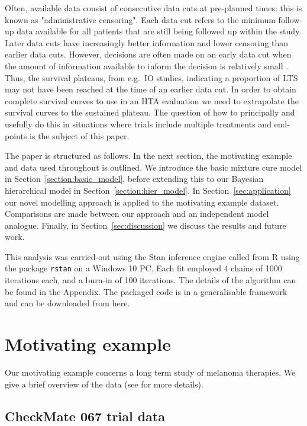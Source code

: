 \documentclass[AMA,STIX1COL]{WileyNJD-v2}
\begin{document}
Often, available data consist of consecutive data cuts at pre-planned times: this is known as "administrative censoring".
Each data cut refers to the minimum follow-up data available for all patients that are still being followed up within the study.
Later data cuts have increasingly better information and lower censoring than earlier data cuts.
However, decisions are often made on an early data cut when the amount of information available to inform the decision is relatively small \citep{Bullement2020}.
Thus, the survival plateaus, from e.g.~IO studies, indicating a proportion of LTS may not have been reached at the time of an earlier data cut.
In order to obtain complete survival curves to use in an HTA evaluation we need to extrapolate the survival curves to the sustained plateau. 
The question of how to principally and usefully do this in situations where trials include multiple treatments and end-points is the subject of this paper.

The paper is structured as follows.
In the next section, the motivating example and data used throughout is outlined.
We introduce the basic mixture cure model in Section~\ref{section:basic_model}, before extending this to our Bayesian hierarchical model in Section~\ref{section:hier_model}.
In Section~\ref{sec:application} our novel modelling approach is applied to the motivating example dataset.
Comparisons are made between our approach and an independent model analogue.
Finally, in Section~\ref{sec:discussion} we discuss the results and future work.

This analysis was carried-out using the Stan inference engine \cite{carpenter2017stan} called from R \cite{Rcoreteam} using the package \texttt{rstan} on a Windows 10 PC.
Each fit employed 4 chains of 1000 iterations each, and a burn-in of 100 iterations.
The details of the algorithm can be found in the Appendix.
The packaged code is in a generalisable framework and can be downloaded from here.


\section{Motivating example}\label{sec:example}
Our motivating example concerns a long term study of melanoma therapies.
We give a brief overview of the data (see \cite{Larkin2019} for more details).

\subsection{CheckMate 067 trial data}
\end{document}
